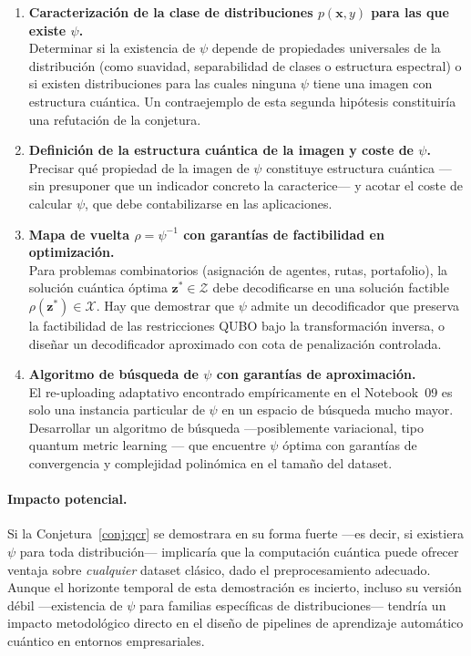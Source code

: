\begin{enumerate}
  \item \textbf{Caracterización de la clase de distribuciones $p(\mathbf{x},y)$ para las que existe $\psi$.} \\
  Determinar si la existencia de $\psi$ depende de propiedades universales de la distribución (como suavidad, separabilidad de clases o estructura espectral) o si existen distribuciones para las cuales ninguna $\psi$ tiene una imagen con estructura cuántica. Un contraejemplo de esta segunda hipótesis constituiría una refutación de la conjetura.

  \item \textbf{Definición de la estructura cuántica de la imagen y coste de $\psi$.} \\
  Precisar qué propiedad de la imagen de $\psi$ constituye estructura cuántica ---sin presuponer que un indicador concreto la caracterice--- y acotar el coste de calcular $\psi$, que debe contabilizarse en las aplicaciones.

  \item \textbf{Mapa de vuelta $\rho=\psi^{-1}$ con garantías de factibilidad en optimización.} \\
  Para problemas combinatorios (asignación de agentes, rutas, portafolio), la solución cuántica óptima $\mathbf{z}^* \in \mathcal{Z}$ debe decodificarse en una solución factible $\rho(\mathbf{z}^*) \in \mathcal{X}$. Hay que demostrar que $\psi$ admite un decodificador que preserva la factibilidad de las restricciones QUBO bajo la transformación inversa, o diseñar un decodificador aproximado con cota de penalización controlada.

  \item \textbf{Algoritmo de búsqueda de $\psi$ con garantías de aproximación.} \\
  El re-uploading adaptativo encontrado empíricamente en el Notebook~09 es solo una instancia particular de $\psi$ en un espacio de búsqueda mucho mayor. Desarrollar un algoritmo de búsqueda ---posiblemente variacional, tipo quantum metric learning \citep{lloyd2020}--- que encuentre $\psi$ óptima con garantías de convergencia y complejidad polinómica en el tamaño del dataset.
\end{enumerate}

\paragraph{Impacto potencial.}
Si la Conjetura~\ref{conj:qcr} se demostrara en su forma fuerte ---es decir, si existiera $\psi$ para toda distribución--- implicaría que la computación cuántica puede ofrecer ventaja sobre \emph{cualquier} dataset clásico, dado el preprocesamiento adecuado. Aunque el horizonte temporal de esta demostración es incierto, incluso su versión débil ---existencia de $\psi$ para familias específicas de distribuciones--- tendría un impacto metodológico directo en el diseño de pipelines de aprendizaje automático cuántico en entornos empresariales.

